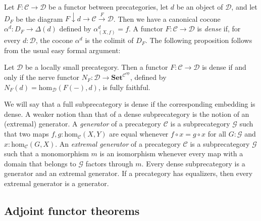 \documentclass[reqno]{amsart}
\theoremstyle{definition}
\theoremstyle{remark}
\newcommand{\fs}[1]{\mathrm{#1}}
\newcommand{\cat}[1]{\mathbf{#1}}
\newcommand{\scat}[1]{\mathcal{#1}}
\renewcommand{\hom}{\fs{hom}}
\newcommand{\Set}{\cat{Set}}
\numberwithin{figure}{section}
\begin{document}
Let $F : \scat{C} \to \scat{D}$ be a functor between precategories, let $d$ be an object of $\scat{D}$, and let $D_F$ be the diagram $F \downarrow d \to \scat{C} \xrightarrow{F} \scat{D}$.
Then we have a canonical cocone $\alpha^d : D_F \to \Delta(d)$ defined by $\alpha^d_{(X,f)} = f$.
A functor $F : \scat{C} \to \scat{D}$ is \emph{dense} if, for every $d : \scat{D}$, the cocone $\alpha^d$ is the colimit of $D_F$.
The following proposition follows from the usual easy formal argument:

\begin{prop}
Let $\scat{D}$ be a locally small precategory.
Then a functor $F : \scat{C} \to \scat{D}$ is dense if and only if the nerve functor $N_F : \scat{D} \to \Set^{\scat{C}^\fs{op}}$, defined by $N_F(d) = \hom_\scat{D}(F(-),d)$, is fully faithful.
\end{prop}

We will say that a full subprecategory is dense if the corresponding embedding is dense.
A weaker notion than that of a dense subprecategory is the notion of an (extremal) generator.
A \emph{generator} of a precategory $\scat{C}$ is a subprecategory $\scat{G}$ such that two maps $f,g : \hom_\scat{C}(X,Y)$ are equal whenever $f \circ x = g \circ x$ for all $G : \scat{G}$ and $x : \hom_\scat{C}(G,X)$.
An \emph{extremal generator} of a precategory $\scat{C}$ is a subprecategory $\scat{G}$ such that a monomorphism $m$ is an isomorphism whenever every map with a domain that belongs to $\scat{G}$ factors through $m$.
Every dense subprecategory is a generator and an extremal generator.
If a precategory has equalizers, then every extremal generator is a generator.

\subsection{Adjoint functor theorems}
\end{document}

